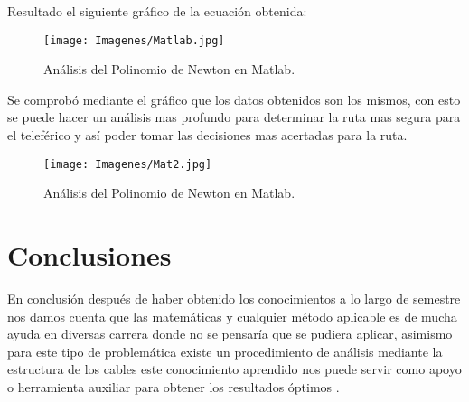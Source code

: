 \documentclass[fleqn,10pt]{olplainarticle}
\begin{document}
Resultado el siguiente gráfico de la ecuación obtenida:
\begin{figure}[h!]
\centering
\texttt{[image: Imagenes/Matlab.jpg]}
\caption{Análisis del Polinomio de Newton en Matlab.}
\end{figure}

Se comprobó mediante el gráfico que los datos obtenidos son los mismos, con esto se puede hacer un análisis mas profundo para determinar la ruta mas segura para el teleférico y así poder tomar las decisiones mas acertadas para la ruta.  

\begin{figure}[h!]
\centering
\texttt{[image: Imagenes/Mat2.jpg]}
\caption{Análisis del Polinomio de Newton en Matlab.}
\end{figure}
\bigskip
\bigskip
\bigskip


\section*{Conclusiones}

En conclusión después de haber obtenido los conocimientos a lo largo de semestre nos damos cuenta que las matemáticas y cualquier método aplicable es de mucha ayuda en diversas carrera donde no se pensaría que se pudiera aplicar, asimismo para este tipo de problemática existe un procedimiento de análisis mediante la estructura de los cables este conocimiento aprendido nos puede servir como apoyo o herramienta auxiliar para obtener los resultados óptimos .
\end{document}
